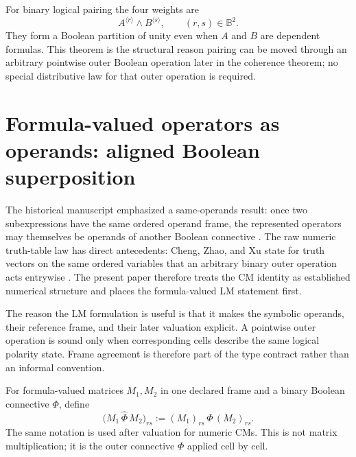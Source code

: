\documentclass[11pt]{article}
\theoremstyle{definition}
\theoremstyle{remark}
\newcommand{\B}{\mathbb B}
\begin{document}
For binary logical pairing the four weights are
\[
 A^{\langle r\rangle}\land B^{\langle s\rangle},
 \qquad (r,s)\in\B^2.
\]
They form a Boolean partition of unity even when $A$ and $B$ are dependent formulas.  This theorem is the structural reason pairing can be moved through an arbitrary pointwise outer Boolean operation later in the coherence theorem; no special distributive law for that outer operation is required.

\section{Formula-valued operators as operands: aligned Boolean superposition}
\label{sec:operatoronoperator}

The historical manuscript emphasized a same-operands result: once two subexpressions have the same ordered operand frame, the represented operators may themselves be operands of another Boolean connective \cite{Droncheff2018}.  The raw numeric truth-table law has direct antecedents: Cheng, Zhao, and Xu state for truth vectors on the same ordered variables that an arbitrary binary outer operation acts entrywise \cite[Prop.~3.3]{Cheng2011}.  The present paper therefore treats the CM identity as established numerical structure and places the formula-valued LM statement first.

The reason the LM formulation is useful is that it makes the symbolic operands, their reference frame, and their later valuation explicit.  A pointwise outer operation is sound only when corresponding cells describe the same logical polarity state.  Frame agreement is therefore part of the type contract rather than an informal convention.

For formula-valued matrices $M_1,M_2$ in one declared frame and a binary Boolean connective $\Phi$, define
\begin{equation}
 \bigl(M_1\,\widehat\Phi\,M_2\bigr)_{rs}
 :=(M_1)_{rs}\,\Phi\,(M_2)_{rs}.
 \label{eq:binarypointwise}
\end{equation}
The same notation is used after valuation for numeric CMs.  This is not matrix multiplication; it is the outer connective $\Phi$ applied cell by cell.
\end{document}
